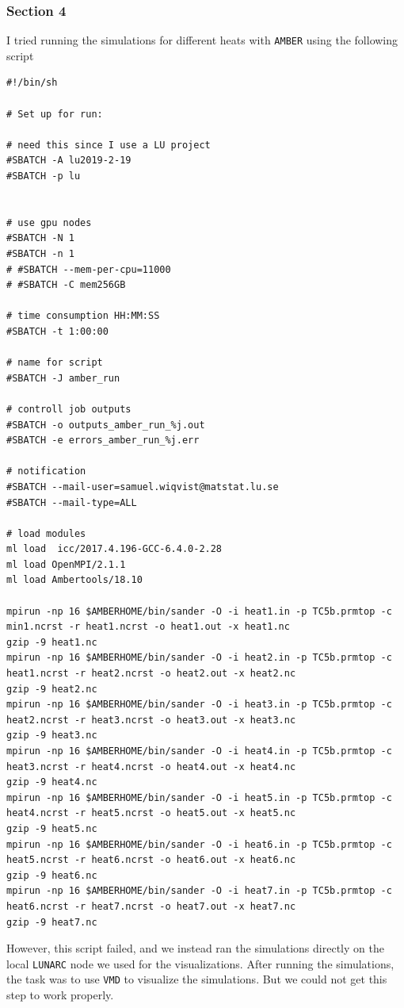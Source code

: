 \documentclass[11pt]{article}
\begin{document}
\subsubsection{Section 4}\label{section-4}

I tried running the simulations for different heats with \texttt{AMBER}
using the following script

\begin{verbatim}
#!/bin/sh

# Set up for run:

# need this since I use a LU project
#SBATCH -A lu2019-2-19
#SBATCH -p lu


# use gpu nodes
#SBATCH -N 1
#SBATCH -n 1
# #SBATCH --mem-per-cpu=11000
# #SBATCH -C mem256GB

# time consumption HH:MM:SS
#SBATCH -t 1:00:00

# name for script
#SBATCH -J amber_run

# controll job outputs
#SBATCH -o outputs_amber_run_%j.out
#SBATCH -e errors_amber_run_%j.err

# notification
#SBATCH --mail-user=samuel.wiqvist@matstat.lu.se
#SBATCH --mail-type=ALL

# load modules
ml load  icc/2017.4.196-GCC-6.4.0-2.28
ml load OpenMPI/2.1.1
ml load Ambertools/18.10

mpirun -np 16 $AMBERHOME/bin/sander -O -i heat1.in -p TC5b.prmtop -c min1.ncrst -r heat1.ncrst -o heat1.out -x heat1.nc
gzip -9 heat1.nc
mpirun -np 16 $AMBERHOME/bin/sander -O -i heat2.in -p TC5b.prmtop -c heat1.ncrst -r heat2.ncrst -o heat2.out -x heat2.nc
gzip -9 heat2.nc
mpirun -np 16 $AMBERHOME/bin/sander -O -i heat3.in -p TC5b.prmtop -c heat2.ncrst -r heat3.ncrst -o heat3.out -x heat3.nc
gzip -9 heat3.nc
mpirun -np 16 $AMBERHOME/bin/sander -O -i heat4.in -p TC5b.prmtop -c heat3.ncrst -r heat4.ncrst -o heat4.out -x heat4.nc
gzip -9 heat4.nc
mpirun -np 16 $AMBERHOME/bin/sander -O -i heat5.in -p TC5b.prmtop -c heat4.ncrst -r heat5.ncrst -o heat5.out -x heat5.nc
gzip -9 heat5.nc
mpirun -np 16 $AMBERHOME/bin/sander -O -i heat6.in -p TC5b.prmtop -c heat5.ncrst -r heat6.ncrst -o heat6.out -x heat6.nc
gzip -9 heat6.nc
mpirun -np 16 $AMBERHOME/bin/sander -O -i heat7.in -p TC5b.prmtop -c heat6.ncrst -r heat7.ncrst -o heat7.out -x heat7.nc
gzip -9 heat7.nc
\end{verbatim}

However, this script failed, and we instead ran the simulations directly
on the local \texttt{LUNARC} node we used for the visualizations. After
running the simulations, the task was to use \texttt{VMD} to visualize
the simulations. But we could not get this step to work properly.
\end{document}
